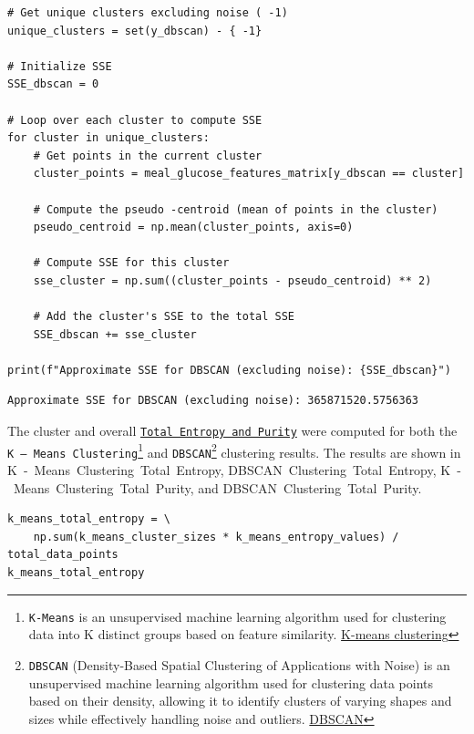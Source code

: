 \begin{verbatim}
# Get unique clusters excluding noise ( -1)
unique_clusters = set(y_dbscan) - { -1}

# Initialize SSE
SSE_dbscan = 0

# Loop over each cluster to compute SSE
for cluster in unique_clusters:
    # Get points in the current cluster
    cluster_points = meal_glucose_features_matrix[y_dbscan == cluster]
    
    # Compute the pseudo -centroid (mean of points in the cluster)
    pseudo_centroid = np.mean(cluster_points, axis=0)
    
    # Compute SSE for this cluster
    sse_cluster = np.sum((cluster_points - pseudo_centroid) ** 2)
    
    # Add the cluster's SSE to the total SSE
    SSE_dbscan += sse_cluster

print(f"Approximate SSE for DBSCAN (excluding noise): {SSE_dbscan}")
\end{verbatim}

\begin{verbatim}
Approximate SSE for DBSCAN (excluding noise): 365871520.5756363
\end{verbatim}

The cluster and overall \href{https://towardsdatascience.com/evaluation-metrics-for-clustering-models-5dde821dd6cd/}{\texttt{Total Entropy and Purity}} were computed for both the \texttt{K -- Means Clustering}\footnote{\texttt{K-Means} is an unsupervised machine learning algorithm used for clustering data into K distinct groups based on feature similarity. \href{https://en.wikipedia.org/wiki/K-means\_clustering}{K-means clustering}} and \texttt{DBSCAN}\footnote{\texttt{DBSCAN} (Density-Based Spatial Clustering of Applications with Noise) is an unsupervised machine learning algorithm used for clustering data points based on their density, allowing it to identify clusters of varying shapes and sizes while effectively handling noise and outliers. \href{https://en.wikipedia.org/wiki/DBSCAN}{DBSCAN}} clustering results.  The results are shown in K~-~Means~Clustering~Total~Entropy, DBSCAN~Clustering~Total~Entropy, K~-~Means~Clustering~Total~Purity, and DBSCAN~Clustering~Total~Purity.

\begin{verbatim}
k_means_total_entropy = \
    np.sum(k_means_cluster_sizes * k_means_entropy_values) / total_data_points
k_means_total_entropy
\end{verbatim}

